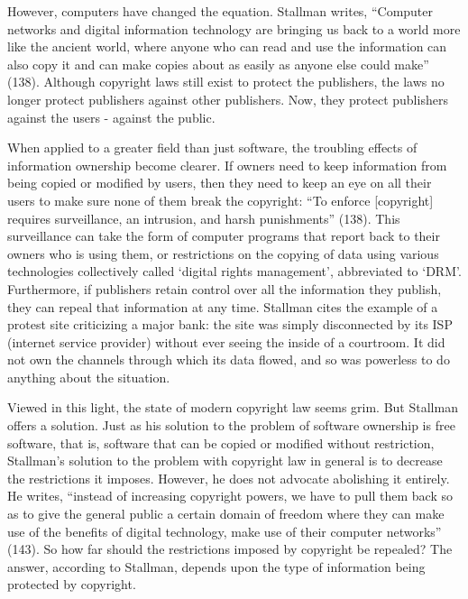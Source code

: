 \documentclass[titlepage]{article}
\begin{document}
However, computers have changed the equation. Stallman writes,
``Computer networks and digital information technology are bringing us
back to a world more like the ancient world, where anyone who can read
and use the information can also copy it and can make copies about as
easily as anyone else could make'' (138). Although copyright laws still
exist to protect the publishers, the laws no longer protect publishers
against other publishers. Now, they protect publishers against the users
- against the public.

When applied to a greater field than just software, the troubling
effects of information ownership become clearer. If owners need to keep
information from being copied or modified by users, then they need to
keep an eye on all their users to make sure none of them break the
copyright: ``To enforce {[}copyright{]} requires surveillance, an
intrusion, and harsh punishments'' (138). This surveillance can take the
form of computer programs that report back to their owners who is using
them, or restrictions on the copying of data using various technologies
collectively called `digital rights management', abbreviated to `DRM'.
Furthermore, if publishers retain control over all the information they
publish, they can repeal that information at any time. Stallman cites
the example of a protest site criticizing a major bank: the site was
simply disconnected by its ISP (internet service provider) without ever
seeing the inside of a courtroom. It did not own the channels through
which its data flowed, and so was powerless to do anything about the
situation.

Viewed in this light, the state of modern copyright law seems grim. But
Stallman offers a solution. Just as his solution to the problem of
software ownership is free software, that is, software that can be
copied or modified without restriction, Stallman's solution to the
problem with copyright law in general is to decrease the restrictions it
imposes. However, he does not advocate abolishing it entirely. He
writes, ``instead of increasing copyright powers, we have to pull them
back so as to give the general public a certain domain of freedom where
they can make use of the benefits of digital technology, make use of
their computer networks'' (143). So how far should the restrictions
imposed by copyright be repealed? The answer, according to Stallman,
depends upon the type of information being protected by copyright.
\end{document}
